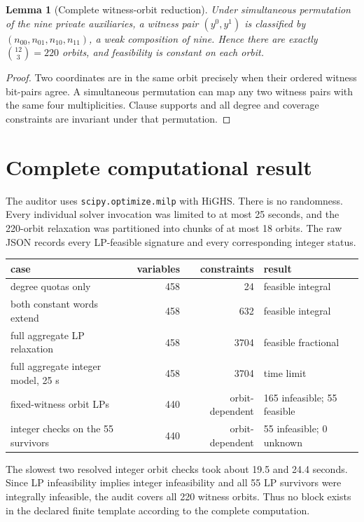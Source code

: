 \documentclass[11pt]{article}
\newtheorem{lemma}{Lemma}
\begin{document}
\begin{lemma}[Complete witness-orbit reduction]
Under simultaneous permutation of the nine private auxiliaries, a witness
pair $(y^0,y^1)$ is classified by
$(n_{00},n_{01},n_{10},n_{11})$, a weak composition of nine.  Hence there are
exactly $\binom{12}{3}=220$ orbits, and feasibility is constant on each orbit.
\end{lemma}
\begin{proof}
Two coordinates are in the same orbit precisely when their ordered witness
bit-pairs agree.  A simultaneous permutation can map any two witness pairs
with the same four multiplicities.  Clause supports and all degree and
coverage constraints are invariant under that permutation.
\end{proof}

\section{Complete computational result}
The auditor uses \texttt{scipy.optimize.milp} with HiGHS.  There is no
randomness.  Every individual solver invocation was limited to at most
25 seconds, and the 220-orbit relaxation was partitioned into chunks of at
most 18 orbits.  The raw JSON records every LP-feasible signature and every
corresponding integer status.

\begin{center}
\begin{tabular}{lrrl}
\toprule
case & variables & constraints & result\\
\midrule
degree quotas only &458&24&feasible integral\\
both constant words extend &458&632&feasible integral\\
full aggregate LP relaxation &458&3704&feasible fractional\\
full aggregate integer model, 25 s &458&3704&time limit\\
fixed-witness orbit LPs &440&orbit-dependent&165 infeasible; 55 feasible\\
integer checks on the 55 survivors &440&orbit-dependent&55 infeasible; 0 unknown\\
\bottomrule
\end{tabular}
\end{center}

The slowest two resolved integer orbit checks took about 19.5 and 24.4
seconds.  Since LP infeasibility implies integer infeasibility and all 55
LP survivors were integrally infeasible, the audit covers all 220 witness
orbits.  Thus no block exists in the declared finite template according to
the complete computation.
\end{document}
